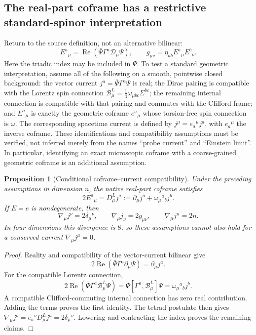 \documentclass[11pt,a4paper]{article}
\newtheorem{proposition}{Proposition}
\begin{document}
\subsection{The real-part coframe has a restrictive standard-spinor interpretation}
Return to the source definition, not an alternative bilinear:
\[
 E^a{}_{\mu}=\operatorname{Re}
 (\bar\Psi\Gamma^a\mathcal D_\mu\Psi),\qquad
 g_{\mu\nu}=\eta_{ab}E^a{}_{\mu}E^b{}_{\nu}.
\]
Here the triadic index may be included in $\Psi$. To test a standard
geometric interpretation, assume all of the following on a smooth,
pointwise closed background: the vector current
$j^a=\bar\Psi\Gamma^a\Psi$ is real; the Dirac pairing is compatible with
the Lorentz spin connection
$\mathcal B^L_\mu=\tfrac14\omega_{\mu bc}\Sigma^{bc}$; the remaining
internal connection is compatible with that pairing and commutes with
the Clifford frame; and $E^a{}_{\mu}$ is exactly the geometric coframe
$e^a{}_{\mu}$ whose torsion-free spin connection is $\omega$.
The corresponding spacetime current is defined by
$j^\mu=e_a{}^\mu j^a$, with $e_a{}^\mu$ the inverse coframe. These
identifications and compatibility assumptions must be verified, not
inferred merely from the names ``probe current'' and ``Einstein limit''.
In particular, identifying an exact microscopic coframe with a
coarse-grained geometric coframe is an additional assumption.

\begin{proposition}[Conditional coframe--current compatibility]
Under the preceding assumptions in dimension $n$, the native real-part
coframe satisfies
\[
 2E^a{}_{\mu}=D^L_\mu j^a
 :=\partial_\mu j^a+\omega_\mu{}^a{}_b j^b.
\]
If $E=e$ is nondegenerate, then
\[
 \nabla_\mu j^\nu=2\delta_\mu{}^\nu,\qquad
 \nabla_\mu j_\nu=2g_{\mu\nu},\qquad
 \nabla_\mu j^\mu=2n.
\]
In four dimensions this divergence is $8$, so these assumptions cannot
also hold for a conserved current $\nabla_\mu j^\mu=0$.
\end{proposition}
\begin{proof}
Reality and compatibility of the vector-current bilinear give
\[
 2\operatorname{Re}(\bar\Psi\Gamma^a\partial_\mu\Psi)
 =\partial_\mu j^a.
\]
For the compatible Lorentz connection,
\[
 2\operatorname{Re}(\bar\Psi\Gamma^a\mathcal B^L_\mu\Psi)
 =\bar\Psi[\Gamma^a,\mathcal B^L_\mu]\Psi
 =\omega_\mu{}^a{}_b j^b.
\]
A compatible Clifford-commuting internal connection has zero real
contribution. Adding the terms proves the first identity. The tetrad
postulate then gives
$\nabla_\mu j^\nu=e_a{}^\nu D^L_\mu j^a=2\delta_\mu{}^\nu$.
Lowering and contracting the index proves the remaining claims.
\end{proof}
\end{document}
